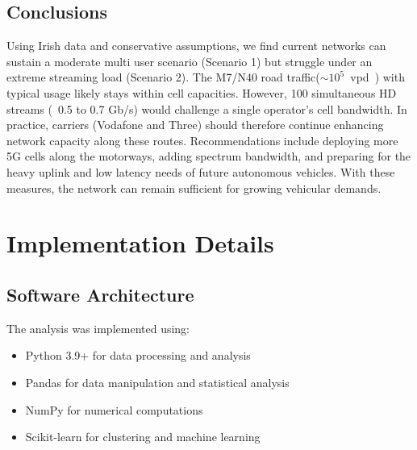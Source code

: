 \documentclass[MScCS]{uccthesis}
\begin{document}
\subsection{Conclusions}
Using Irish data and conservative assumptions, we find current networks can sustain a moderate multi user scenario (Scenario 1) but struggle under an extreme streaming load (Scenario 2). 
The M7/N40 road traffic($\sim10^{5}$~vpd~\cite{tii_m7_traffic}\cite{tii_n40_traffic}) with typical usage likely stays within cell capacities. However, 100 simultaneous HD streams (~0.5 to 0.7 Gb/s) would challenge a single operator's cell bandwidth. In practice, carriers (Vodafone and Three) should therefore continue enhancing network capacity along these routes. Recommendations include deploying more 5G cells along the motorways, adding spectrum bandwidth, and preparing for the heavy uplink and low latency needs of future autonomous vehicles\cite{comreg_autonomous}\cite{5gcroc_project}. With these measures, the network can remain sufficient for growing vehicular demands.

\begin{center}
\end{center}


 \section{Implementation Details}

   \subsection{Software Architecture}
   The analysis was implemented using:
   \begin{itemize}
   \item Python 3.9+ for data processing and analysis
   \item Pandas for data manipulation and statistical analysis
   \item NumPy for numerical computations
   \item Scikit-learn for clustering and machine learning
   \end{itemize}
\end{document}
